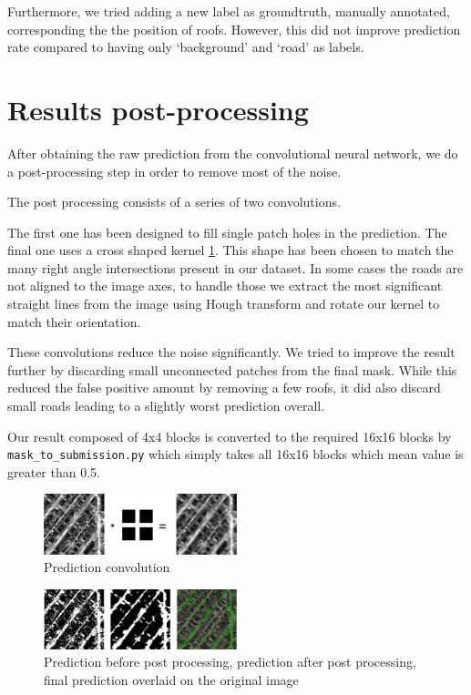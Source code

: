 \documentclass[11pt,conference,compsocconf]{IEEEtran}
\begin{document}
Furthermore, we tried adding a new label as groundtruth, manually annotated, corresponding the the position of roofs. However, this did not improve prediction rate compared to having only `background' and `road' as labels.


\section{Results post-processing}
After obtaining the raw prediction from the convolutional neural network, we do a post-processing step in order to remove most of the noise.

The post processing consists of a series of two convolutions.

The first one has been designed to fill single patch holes in the prediction.
The final one uses a cross shaped kernel \ref{fig:conv}. This shape has been chosen to match the many right angle intersections present in our dataset.
In some cases the roads are not aligned to the image axes, to handle those we extract the most significant straight lines from the image using Hough transform and rotate our kernel to match their orientation.

These convolutions reduce the noise significantly. We tried to improve the result further by discarding small unconnected patches from the final mask. While this reduced the false positive amount by removing  a few roofs, it did also discard small roads leading to a slightly worst prediction overall.

Our result composed of 4x4 blocks is converted to the required 16x16 blocks by \texttt{mask\_to\_submission.py} which simply takes all 16x16 blocks which mean value is greater than 0.5.

\begin{figure}[h]
\includegraphics[width=0.5\textwidth]{conv.png}
\caption{Prediction convolution}
\label{fig:conv}
\end{figure}

\begin{figure}[h]
\includegraphics[width=0.5\textwidth]{final.png}
\caption{Prediction before post processing, prediction after post processing, final prediction overlaid on the original image}
\end{figure}
\end{document}
